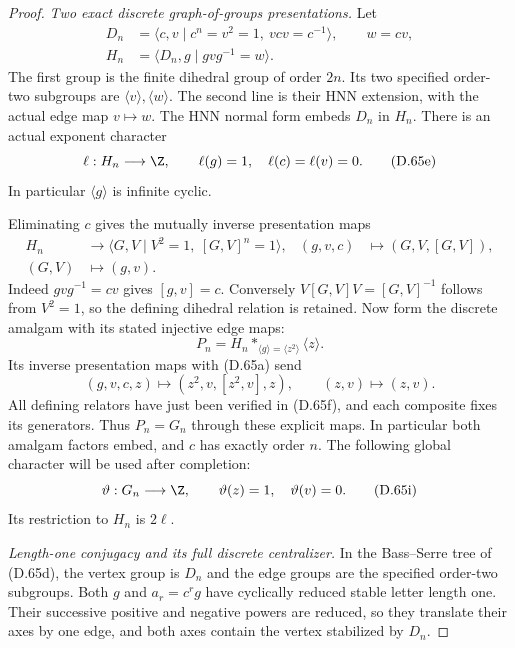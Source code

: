 \begin{proof}
\emph{Two exact discrete graph-of-groups presentations.}
Let
\[
 \begin{split}
 D_n&=\langle c,v\mid c^n=v^2=1,\ vcv=c^{-1}\rangle,
           \qquad w=cv,\\
 H_n&=\langle D_n,g\mid gvg^{-1}=w\rangle.
 \end{split}                                                  \tag{D.65d}
\]
The first group is the finite dihedral group of order
$2n$. Its two specified order-two subgroups are
$\langle v\rangle,\langle w\rangle$.
The second line is their HNN extension, with the
actual edge map $v\mapsto w$.
The HNN normal form embeds $D_n$ in $H_n$.
There is an actual exponent character
\[
        \ell:H_n\longrightarrow\Z,\qquad
                   \ell(g)=1,\quad\ell(c)=\ell(v)=0.          \tag{D.65e}
\]
In particular $\langle g\rangle$ is infinite cyclic.

Eliminating $c$ gives the mutually inverse presentation
maps
\[
 \begin{aligned}
 H_n&\longrightarrow
       \langle G,V\mid V^2=1,\ [G,V]^n=1\rangle,
       &(g,v,c)&\longmapsto(G,V,[G,V]),\\
 (G,V)&\longmapsto(g,v).
 \end{aligned}                                                \tag{D.65f}
\]
Indeed $gvg^{-1}=cv$ gives $[g,v]=c$.
Conversely $V[G,V]V=[G,V]^{-1}$ follows from $V^2=1$,
so the defining dihedral relation is retained.
Now form the discrete amalgam with its stated
injective edge maps:
\[
       P_n=H_n*_{\langle g\rangle=\langle z^2\rangle}
                                                 \langle z\rangle .
                                                               \tag{D.65g}
\]
Its inverse presentation maps with (D.65a) send
\[
  (g,v,c,z)\longmapsto(z^2,v,[z^2,v],z),
        \qquad (z,v)\longmapsto(z,v).
                                                               \tag{D.65h}
\]
All defining relators have just been verified in
(D.65f), and each composite fixes its generators.
Thus $P_n=G_n$ through these explicit maps.
In particular both amalgam factors embed, and $c$
has exactly order $n$.
The following global character will be used after
completion:
\[
       \vartheta:G_n\longrightarrow\Z,\qquad
                        \vartheta(z)=1,\quad\vartheta(v)=0.
                                                               \tag{D.65i}
\]
Its restriction to $H_n$ is $2\ell$.

\emph{Length-one conjugacy and its full discrete centralizer.}
In the Bass--Serre tree of (D.65d), the vertex group
is $D_n$ and the edge groups are the specified
order-two subgroups.
Both $g$ and $a_r=c^rg$ have cyclically reduced stable
letter length one. Their successive positive and
negative powers are reduced, so they translate their
axes by one edge, and both axes contain the vertex
stabilized by $D_n$.


\end{proof}
